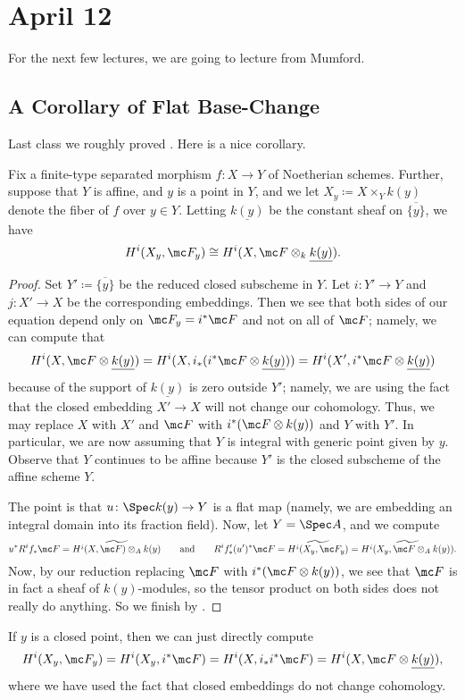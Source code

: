 \documentclass[../notes.tex]{subfiles}
\begin{document}
\section{April 12}

For the next few lectures, we are going to lecture from Mumford.

\subsection{A Corollary of Flat Base-Change}
Last class we roughly proved . Here is a nice corollary.
\begin{corollary}
	Fix a finite-type separated morphism $f\colon X\to Y$ of Noetherian schemes. Further, suppose that $Y$ is affine, and $y$ is a point in $Y$, and we let $X_y\coloneqq X\times_Yk(y)$ denote the fiber of $f$ over $y\in Y$. Letting $\underline{k(y)}$ be the constant sheaf on $\overline{\{y\}}$, we have
	\[H^i(X_y,\mc F_y)\cong H^i(X,\mc F\otimes_k\underline{k(y)}).\]
\end{corollary}
\begin{proof}
	Set $Y'\coloneqq\overline{\{y\}}$ be the reduced closed subscheme in $Y$. Let $i\colon Y'\to Y$ and $j\colon X'\to X$ be the corresponding embeddings. Then we see that both sides of our equation depend only on $\mc F_y=i^*\mc F$ and not on all of $\mc F$; namely, we can compute that
	\[H^i(X,\mc F\otimes\underline{k(y)})=H^i(X,i_*(i^*\mc F\otimes\underline{k(y)}))=H^i(X',i^*\mc F\otimes\underline{k(y)})\]
	because of the support of $\underline{k(y)}$ is zero outside $Y'$; namely, we are using the fact that the closed embedding $X'\to X$ will not change our cohomology. Thus, we may replace $X$ with $X'$ and $\mc F$ with $i^*(\mc F\otimes k(y))$ and $Y$ with $Y'$. In particular, we are now assuming that $Y$ is integral with generic point given by $y$. Observe that $Y$ continues to be affine because $Y'$ is the closed subscheme of the affine scheme $Y$.

	The point is that $u\colon\Spec k(y)\to Y$ is a flat map (namely, we are embedding an integral domain into its fraction field). Now, let $Y=\Spec A$, and we compute
	\[u^*R^if_*\mc F=\widetilde{H^i(X,\mc F)\otimes_Ak(y)}\qquad\text{and}\qquad R^if'_*(u')^*\mc F=\widetilde{H^i(X_y,\mc F_y)}=\widetilde{H^i(X_y,\mc F\otimes_Ak(y))}.\]
	Now, by our reduction replacing $\mc F$ with $i^*(\mc F\otimes k(y))$, we see that $\mc F$ is in fact a sheaf of $k(y)$-modules, so the tensor product on both sides does not really do anything. So we finish by .
\end{proof}
\begin{example}
	If $y$ is a closed point, then we can just directly compute
	\[H^i(X_y,\mc F_y)=H^i(X_y,i^*\mc F)=H^i(X,i_*i^*\mc F)=H^i(X,\mc F\otimes\underline{k(y)}),\]
	where we have used the fact that closed embeddings do not change cohomology.
\end{example}
\end{document}
